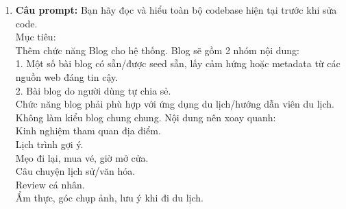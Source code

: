 \begin{enumerate}
Yêu cầu nghiệm thu sau khi sửa: \\

1. Trang chủ hiển thị được danh sách địa điểm có hình ảnh. \\
2. Click vào từng địa điểm xem được thông tin chi tiết. \\
3. UI responsive tốt trên mobile và desktop. \\
4. Không có lỗi console nghiêm trọng. \\
5. Build/lint/test chạy được nếu project có script tương ứng. \\
6. Code mới nhất quán với style hiện tại của codebase. \\
7. Trả lời lại cho tôi: \\
\* Bạn đã đọc được cấu trúc project như thế nào. \\
\* Bạn đã sửa/thêm những file nào. \\
\* Cách chạy để kiểm tra. \\
\* Có phần nào bạn phải giả định vì codebase chưa có dữ liệu hay chưa có route không. \\


Bạn xem xét do đây là thông tin tổng quát, bạn suy nghĩ theo tư duy thiết kế để chọn lọc và thêm thắc những gì mà bạn cho là cần thiết. Với lại những gì không hiểu phải hỏi tôi. Có cần tôi tự làm được thì hãy để tôi tự làm nhé. Bạn không cần tự làm và tôi là bạn đồng hành với bạn \\


\item \textbf{Câu prompt:} Bạn hãy đọc và hiểu toàn bộ codebase hiện tại trước khi sửa code. \\

Mục tiêu: \\
Thêm chức năng Blog cho hệ thống. Blog sẽ gồm 2 nhóm nội dung: \\

1. Một số bài blog có sẵn/được seed sẵn, lấy cảm hứng hoặc metadata từ các nguồn web đáng tin cậy. \\
2. Bài blog do người dùng tự chia sẻ. \\

Chức năng blog phải phù hợp với ứng dụng du lịch/hướng dẫn viên du lịch. Không làm kiểu blog chung chung. Nội dung nên xoay quanh: \\
\* Kinh nghiệm tham quan địa điểm. \\
\* Lịch trình gợi ý. \\
\* Mẹo đi lại, mua vé, giờ mở cửa. \\
\* Câu chuyện lịch sử/văn hóa. \\
\* Review cá nhân. \\
\* Ẩm thực, góc chụp ảnh, lưu ý khi đi du lịch. \\



\end{enumerate}
